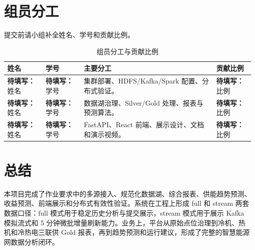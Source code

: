 \documentclass[UTF8,11pt,a4paper]{ctexart}
\newcommand{\todo}[1]{\textbf{待填写：}#1}
\begin{document}
\section{组员分工}

提交前请小组补全姓名、学号和贡献比例。

\begin{table}[H]
\centering
\small
\begin{tabularx}{\textwidth}{p{2.6cm}p{3cm}Yp{2.2cm}}
\toprule
姓名 & 学号 & 主要分工 & 贡献比例 \\
\midrule
\todo{姓名} & \todo{学号} & 集群部署、HDFS/Kafka/Spark 配置、分布式验证。 & \todo{比例} \\
\todo{姓名} & \todo{学号} & 数据湖治理、Silver/Gold 处理、报表与预测算法。 & \todo{比例} \\
\todo{姓名} & \todo{学号} & FastAPI、React 前端、展示设计、文档和演示视频。 & \todo{比例} \\
\bottomrule
\end{tabularx}
\caption{组员分工与贡献比例}
\end{table}

\section{总结}

本项目完成了作业要求中的多源接入、规范化数据湖、综合报表、供能趋势预测、收益预测、前端展示和分布式有效性验证。系统在工程上形成 full 和 stream 两套数据口径：full 模式用于稳定历史分析与提交展示，stream 模式用于展示 Kafka 模拟流式和 5 分钟微批增量刷新能力。业务上，平台从原始点位治理到冷机、热机和冷热电三联供 Gold 报表，再到趋势预测和运行建议，形成了完整的智慧能源网数据分析闭环。
\end{document}
